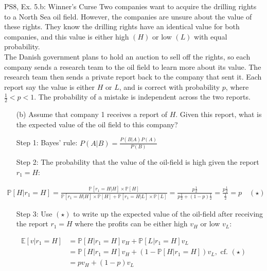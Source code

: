 \begin{frame}{PS8, Ex. 5.b: Winner's Curse}
      Two companies want to acquire the drilling rights to a North Sea oil field. However, the companies are unsure about the value of these rights. They know the drilling rights have an identical value for both companies, and this value is either high $(H)$ or low $(L)$ with equal probability.\\\smallskip
      The Danish government plans to hold an auction to sell off the rights, so each company sends a research team to the oil field to learn more about its value. The research team then sends a private report back to the company that sent it. Each report say the value is either $H$ or $L$, and is correct with probability $p$, where $\frac{1}{2} < p < 1$. The probability of a mistake is independent across the two reports.
      \begin{itemize}
        \item[(b)] Assume that company 1 receives a report of $H$. Given this report, what is the expected value of the oil field to this company?
        \item[Step 1:] Bayes' rule: $P(A|B)=\frac{P(B|A)P(A)}{P(B)}$
        \item[Step 2:] The probability that the value of the oil-field is high given the report $r_1=H$:
        \end{itemize}
        \vspace{-8pt}
        \begin{align*}
          \mathbb{P}[H|r_1=H]=\frac{\mathbb{P}[r_1=H|H]\times\mathbb{P}[H]}{\mathbb{P}[r_1=H|H]\times\mathbb{P}[H]+\mathbb{P}[r_1=H|L]\times\mathbb{P}[L]}=\frac{p\frac{1}{2}}{p\frac{1}{2}+(1-p)\frac{1}{2}}=\frac{p\frac{1}{2}}{\frac{1}{2}}=p\quad (\star)
        \end{align*}
        \vspace{-10pt}
        \begin{itemize}
        \item[Step 3:] Use $(\star)$ to write up the expected value of the oil-field after receiving the report $r_1=H$ where the profits can be either high $v_H$ or low $v_L$:
      \end{itemize}
      \vspace{-6pt}
      \begin{align*}
        \mathbb{E}[v|r_1=H]&=\mathbb{P}[H|r_1=H]v_H+\mathbb{P}[L|r_1=H]v_L\\
        &=\mathbb{P}[H|r_1=H]v_H+\left(1-\mathbb{P}[H|r_1=H]\right)v_L,\text{ cf. }(\star)\\
        &=pv_H+(1-p)v_L
      \end{align*}
      \vfill\null
\end{frame}


